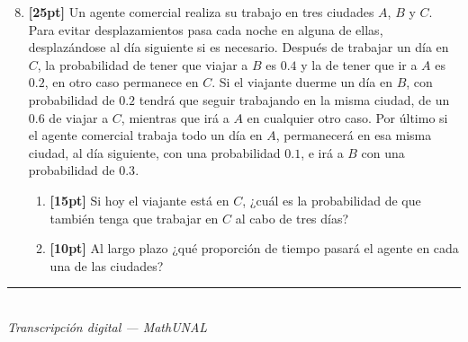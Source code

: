 \documentclass[11pt]{article}
\newcommand{\examfooter}{%
  \vfill
  \rule{\linewidth}{0.4pt}\\[1pt]
  {\scriptsize\textit{Transcripci\'on digital --- MathUNAL}\hfill\textcolor{unalblue}{\textbf{\thepage}}}
}
\begin{document}
\begin{enumerate}
\setcounter{enumi}{7}
\item \textbf{[25pt]} Un agente comercial realiza su trabajo en tres ciudades $A$, $B$ y $C$. Para evitar desplazamientos pasa cada noche en alguna de ellas, desplaz\'andose al d\'ia siguiente si es necesario. Despu\'es de trabajar un d\'ia en $C$, la probabilidad de tener que viajar a $B$ es $0.4$ y la de tener que ir a $A$ es $0.2$, en otro caso permanece en $C$. Si el viajante duerme un d\'ia en $B$, con probabilidad de $0.2$ tendr\'a que seguir trabajando en la misma ciudad, de un $0.6$ de viajar a $C$, mientras que ir\'a a $A$ en cualquier otro caso. Por \'ultimo si el agente comercial trabaja todo un d\'ia en $A$, permanecer\'a en esa misma ciudad, al d\'ia siguiente, con una probabilidad $0.1$, e ir\'a a $B$ con una probabilidad de $0.3$.

\begin{center}
\end{center}

\begin{enumerate}[label=(\alph*)]
\item \textbf{[15pt]} Si hoy el viajante est\'a en $C$, ¿cu\'al es la probabilidad de que tambi\'en tenga que trabajar en $C$ al cabo de tres d\'ias?

\vspace{40pt}
\item \textbf{[10pt]} Al largo plazo ¿qu\'e proporci\'on de tiempo pasar\'a el agente en cada una de las ciudades?
\end{enumerate}
\end{enumerate}

\examfooter
\end{document}

